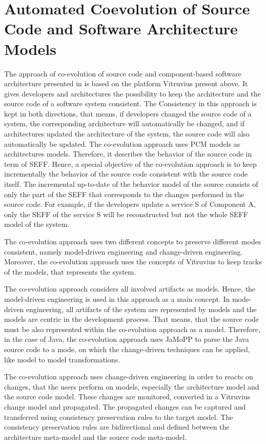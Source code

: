 \section{Automated Coevolution of Source Code and Software Architecture Models}
\label{sec:Automated Coevolution of Source Code and Software Architecture Models}
The approach of co-evolution of source code and component-based software architecture presented in \cite{langhammer2015co, langhammer2017automated} is based on the platform Vitruvius present above. It gives developers and architectures the possibility to keep the architecture and the source code of a software system consistent. The Consistency in this approach is kept in both directions, that means, if developers changed the source code of a system, the corresponding architecture will automatically be changed, and if architectures updated the architecture of the system, the source code will also automatically be updated. The co-evolution approach uses PCM models as architectures models.  Therefore, it describes the behavior of the source code in term of SEFF. Hence, a special objective of the co-evolution approach is to keep incrementally the behavior of the source code consistent with the source code itself. The incremental up-to-date of the behavior model of the source consists of only the part of the SEFF that corresponds to the changes performed in the source code. For example, if the developers update a service S of Component A, only the SEFF of the service S will be reconstructed but not the whole SEFF model of the system. 

The co-evolution approach uses two different concepts to preserve different modes consistent, namely model-driven engineering and change-driven engineering. Moreover, the co-evolution approach uses the concepts of Vitruvius to keep tracks of the models, that represents the system. 

The co-evolution approach considers all involved artifacts as models. Hence, the model-driven engineering is used in this approach as a main concept. In mode-driven engineering, all artifacts of the system are represented by models and the models are centric in the development process. That means, that the source code must be also represented within the co-evolution approach as a model. Therefore, in the case of Java, the co-evolution approach uses JaMoPP to parse the Java source code to a mode, on which the change-driven techniques can be applied, like model to model transformations.

The co-evolution approach uses change-driven engineering in order to reacts on changes, that the users perform on models, especially the architecture model and the source code model. These changes are monitored, converted in a Vitruvius change model and propagated. The propagated changes can be captured and transferred using consistency preservation rules to the target model. The consistency preservation rules are bidirectional and defined between the architecture meta-model and the source code meta-model.

